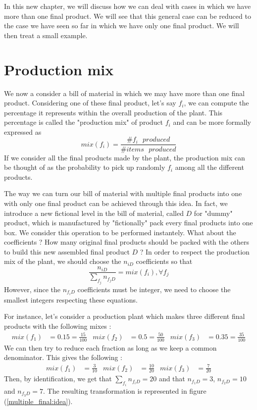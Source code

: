In this new chapter, we will discuss how we can deal with cases in which we have more than one final product. We will see that this general case can be reduced to the case we have seen so far in which we have only one final product. We will then treat a small example.

\section{Production mix}

We now a consider a bill of material in which we may have more than one final product. Considering one of these final product, let's say $f_i$, we can compute the percentage it represents within the overall production of the plant. This percentage is called the "production mix" of product $f_i$ and can be more formally expressed as \[ mix(f_i) = \frac{\#f_i\textrm{ }produced}{\#items\textrm{ }produced} \] If we consider all the final products made by the plant, the production mix can be thought of as the probability to pick up randomly $f_i$ among all the different products. 

The way we can turn our bill of material with multiple final products into one with only one final product can be achieved through this idea. In fact, we introduce a new fictional level in the bill of material, called $D$ for "dummy" product, which is manufactured by "fictionally" pack every final products into one box. We consider this operation to be performed instantely. What about the coefficients ? How many original final products should be packed with the others to build this new assembled final product $D$ ? In order to respect the production mix of the plant, we should choose the $n_{iD}$ coefficients so that \[ \frac{n_{iD}}{\sum_{f_j}n_{f_jD}} = mix(f_i), \forall f_j \] However, since the $n_{f_iD}$ coefficients must be integer, we need to choose the smallest integers respecting these equations. 

For instance, let's consider a production plant which makes three different final products with the following mixes : 
\begin{align*}
    mix(f_1) &= 0.15 = \frac{15}{100} & mix(f_2) &= 0.5 = \frac{50}{100} & mix(f_3) &= 0.35 = \frac{35}{100}
\end{align*}
We can then try to reduce each fraction as long as we keep a common denominator. This gives the following :
\begin{align*}
    mix(f_1) &= \frac{3}{10} & mix(f_2) &= \frac{10}{20} & mix(f_3) &= \frac{7}{20}
\end{align*}
Then, by identification, we get that $\sum_{f_i}n_{f_iD} = 20$ and that $n_{f_1D} = 3$, $n_{f_2D} = 10$ and $n_{f_3D} = 7$. The resulting transformation is represented in figure (\ref{multiple_final:idea}).

